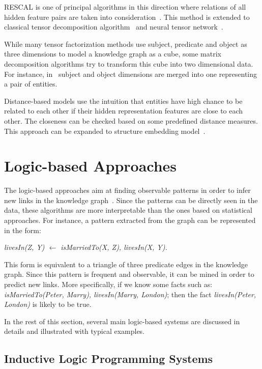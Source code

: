 RESCAL is one of principal algorithms in this direction where relations of all hidden feature pairs are taken into consideration~\cite{ref2, ref3}. This method is extended to classical tensor decomposition algorithm~\cite{ref4} and neural tensor network~\cite{ref5}.

While many tensor factorization methods use subject, predicate and object as three dimensions to model a knowledge graph as a cube, some matrix decomposition algorithms try to transform this cube into two dimensional data. For instance, in~\cite{ref6, ref7} subject and object dimensions are merged into one representing a pair of entities.

Distance-based models use the intuition that entities have high chance to be related to each other if their hidden representation features are close to each other. The closeness can be checked based on some predefined distance measures. This approach can be expanded to structure embedding model~\cite{ref8}.

\section{Logic-based Approaches}

The logic-based approaches aim at finding observable patterns in order to infer new links in the knowledge graph~\cite{ref1}. Since the patterns can be directly seen in the data, these algorithms are more interpretable than the ones based on statistical approaches. For instance, a pattern extracted from the graph can be represented in the form:\\

\centerline{\textit{livesIn(Z, Y) $\leftarrow$ isMarriedTo(X, Z), livesIn(X, Y).}}

This form is equivalent to a triangle of three predicate edges in the knowledge graph. Since this pattern is frequent and observable, it can be mined in order to predict new links. More specifically, if we know some facts such as: \textit{isMarriedTo(Peter, Marry), livesIn(Marry, London)}; then the fact \textit{livesIn(Peter, London)} is likely to be true.

In the rest of this section, several main logic-based systems are discussed in details and illustrated with typical examples.

\subsection{Inductive Logic Programming Systems}

